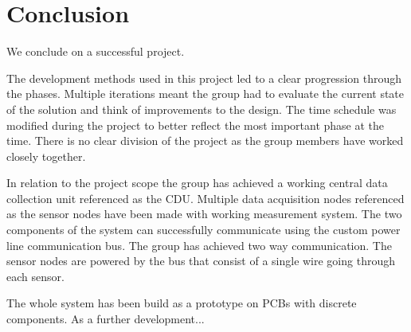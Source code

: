 \chapter{Conclusion}
We conclude on a successful project. 

The development methods used in this project led to a clear progression through the phases. Multiple iterations meant the group had to evaluate the current state of the solution and think of improvements to the design. The time schedule was modified during the project to better reflect the most important phase at the time. There is no clear division of the project as the group members have worked closely together.

In relation to the project scope the group has achieved a working central data collection unit referenced as the CDU. Multiple data acquisition nodes referenced as the sensor nodes have been made with working measurement system. The two components of the system can successfully communicate using the custom power line communication bus. The group has achieved two way communication. The sensor nodes are powered by the bus that consist of a single wire going through each sensor.

The whole system has been build as a prototype on PCBs with discrete components. As a further development...